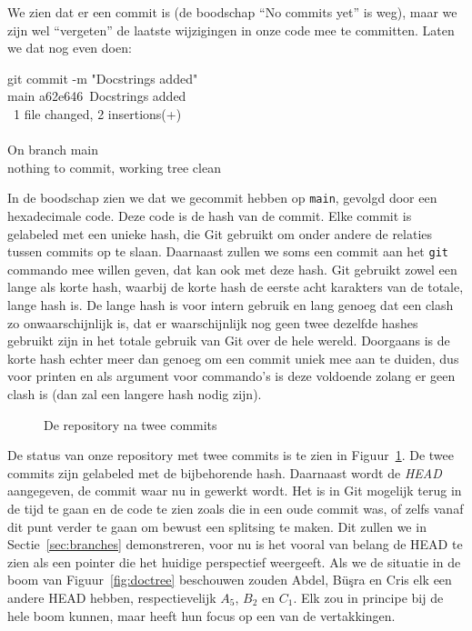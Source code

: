 We zien dat er een commit is (de boodschap \enquote{No commits yet} is weg), maar we zijn wel \enquote{vergeten} de laatste wijzigingen in onze code mee te committen. Laten we dat nog even doen:

\begin{bash}
 git commit -m "Docstrings added" \\
\lbrack main a62e646\rbrack\  Docstrings added\\
\ 1 file changed, 2 insertions(+)\\
~ \\
On branch main\\
nothing to commit, working tree clean\\
\end{bash}

In de boodschap zien we dat we gecommit hebben op \texttt{main}, gevolgd door een hexadecimale code. Deze code is de hash van de commit. Elke commit is gelabeled met een unieke hash, die Git gebruikt om onder andere de relaties tussen commits op te slaan. Daarnaast zullen we soms een commit aan het \texttt{git} commando mee willen geven, dat kan ook met deze hash. Git gebruikt zowel een lange als korte hash, waarbij de korte hash de eerste acht karakters van de totale, lange hash is. De lange hash is voor intern gebruik en lang genoeg dat een clash zo onwaarschijnlijk is, dat er waarschijnlijk nog geen twee dezelfde hashes gebruikt zijn in het totale gebruik van Git over de hele wereld. Doorgaans is de korte hash echter meer dan genoeg om een commit uniek mee aan te duiden, dus voor printen en als argument voor commando's is deze voldoende zolang er geen clash is (dan zal een langere hash nodig zijn).

\begin{figure}[ht]
\label{fig:two-commits}
\caption{De repository na twee commits}
\end{figure}

De status van onze repository met twee commits is te zien in Figuur~\ref{fig:two-commits}. De twee commits zijn gelabeled met de bijbehorende hash. Daarnaast wordt de \emph{HEAD} aangegeven, de commit waar nu in gewerkt wordt. Het is in Git mogelijk terug in de tijd te gaan en de code te zien zoals die in een oude commit was, of zelfs vanaf dit punt verder te gaan om bewust een splitsing te maken. Dit zullen we in Sectie~\ref{sec:branches} demonstreren, voor nu is het vooral van belang de HEAD te zien als een pointer die het huidige perspectief weergeeft. Als we de situatie in de boom van Figuur~\ref{fig:doctree} beschouwen zouden Abdel, B\"u\c sra en Cris elk een andere HEAD hebben, respectievelijk $A_5$, $B_2$ en $C_1$. Elk zou in principe bij de hele boom kunnen, maar heeft hun focus op een van de vertakkingen.

